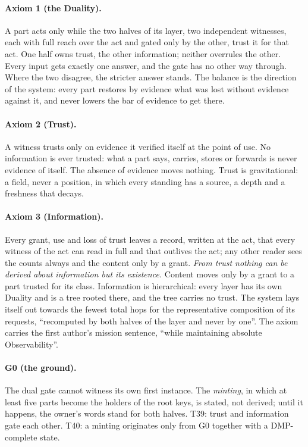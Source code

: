 \documentclass[11pt,a4paper]{article}
\theoremstyle{definition}
\theoremstyle{remark}
\begin{document}
\paragraph{Axiom 1 (the Duality).} A part acts only while the two halves of its layer, two independent witnesses, each with full reach
over the act and gated only by the other, trust it for that act. One half owns trust, the other information; neither overrules the
other. Every input gets exactly one answer, and the gate has no other way through. Where the two disagree, the stricter answer stands.
The balance is the direction of the system: every part restores by evidence what was lost without evidence against it, and never lowers
the bar of evidence to get there.

\paragraph{Axiom 2 (Trust).} A witness trusts only on evidence it verified itself at the point of use. No information is ever trusted:
what a part says, carries, stores or forwards is never evidence of itself. The absence of evidence moves nothing. Trust is gravitational:
a field, never a position, in which every standing has a source, a depth and a freshness that decays.

\paragraph{Axiom 3 (Information).} Every grant, use and loss of trust leaves a record, written at the act, that every witness of the act
can read in full and that outlives the act; any other reader sees the counts always and the content only by a grant. \emph{From trust
nothing can be derived about information but its existence.} Content moves only by a grant to a part trusted for its class. Information
is hierarchical: every layer has its own Duality and is a tree rooted there, and the tree carries no trust. The system lays itself out
towards the fewest total hops for the representative composition of its requests, ``recomputed by both halves of the layer and never by
one''. The axiom carries the first author's mission sentence, ``while maintaining absolute Observability''.

\paragraph{G0 (the ground).} The dual gate cannot witness its own first instance. The \emph{minting}, in which at least five parts become
the holders of the root keys, is stated, not derived; until it happens, the owner's words stand for both halves. T39: trust and
information gate each other. T40: a minting originates only from G0 together with a DMP-complete state.
\end{document}
